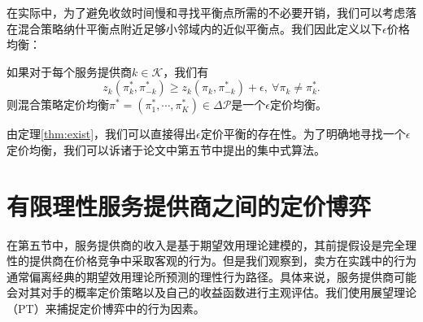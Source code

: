 在实际中，为了避免收敛时间慢和寻找平衡点所需的不必要开销，我们可以考虑落在混合策略纳什平衡点附近足够小邻域内的近似平衡点。我们因此定义以下$\epsilon$价格均衡：
\begin{df}
如果对于每个服务提供商$k\in\mathcal{K}$，我们有
\begin{equation}\label{approxNE}
z_{k}(\pi_{k}^*,\pi_{-k}^*)\ge z_{k}(\pi_{k},\pi_{-k}^*) + \epsilon,~\forall \pi_k\ne\pi_k^*.
\end{equation}
则混合策略定价均衡$\pi^*=(\pi_{1}^*,\cdots,\pi_{K}^*)\in\Delta\mathcal{P}$是一个$\epsilon$定价均衡。
\end{df}
由定理\ref{thm:exist}，我们可以直接得出$\epsilon$定价平衡的存在性。为了明确地寻找一个$\epsilon$定价均衡，我们可以诉诸于论文\cite{MYCISS16}中第五节中提出的集中式算法。

\section{有限理性服务提供商之间的定价博弈}\label{sec:stageI2}
在第五节中，服务提供商的收入是基于期望效用理论建模的，其前提假设是完全理性的提供商在价格竞争中采取客观的行为。但是我们观察到，卖方在实践中的行为通常偏离经典的期望效用理论\cite{Kahneman}所预测的理性行为路径。具体来说，服务提供商可能会对其对手的概率定价策略以及自己的收益函数进行主观评估。我们使用展望理论（PT）来捕捉定价博弈中的行为因素。

